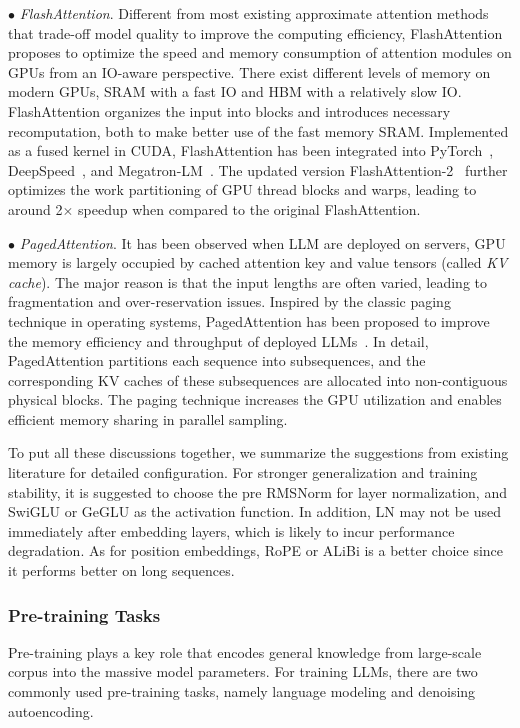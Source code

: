 {{    $\bullet$ \emph{FlashAttention}. Different from most existing approximate attention methods that trade-off model quality to improve the computing efficiency, FlashAttention~\cite{Dao-NeurIPS-2020-FLASH} proposes to optimize the speed and memory consumption of attention modules on GPUs from an IO-aware perspective. There exist different levels of memory on modern GPUs, \eg SRAM with a fast IO and HBM with a relatively slow IO. FlashAttention organizes the input into blocks and introduces necessary recomputation, both to make better use of the fast memory SRAM.  Implemented as a fused kernel in CUDA, FlashAttention has been integrated into PyTorch~\cite{Paszke-NeurIPS-2019-Pytorch}, DeepSpeed~\cite{Rasley-KDD-2020-DeepSpeed}, and Megatron-LM~\cite{Shoeybi-arXiv-2019-Megatron}. {The updated version FlashAttention-2~\cite{Dao-2023-arxiv-flashattention2} further optimizes the work partitioning of GPU thread blocks and warps, leading to around 2$\times$ speedup when compared to the original FlashAttention.}

    $\bullet$ \emph{PagedAttention}.  %
    {It has been observed when LLM are deployed on servers, GPU memory is largely occupied by cached attention key and value tensors (called \emph{KV cache}). The major reason is that the input lengths are often varied, leading to fragmentation and over-reservation issues. Inspired by the classic paging technique in operating systems, PagedAttention has been proposed to improve the memory efficiency and throughput of deployed LLMs~\cite{vllm-pagedattention}. In detail, PagedAttention partitions each sequence into subsequences, and the corresponding KV caches of these subsequences are allocated into non-contiguous physical blocks. The paging technique increases the GPU utilization  and enables efficient memory sharing in parallel sampling.}


To put all these discussions together, we summarize the suggestions from existing literature for detailed configuration.  
For stronger generalization and training stability, it is suggested to choose the pre RMSNorm for layer normalization, and SwiGLU or GeGLU as the activation function. %
{In addition,  LN may not be used immediately after embedding layers, which is likely to incur  performance degradation.} As for position embeddings, {RoPE} or ALiBi is a better choice since it performs better on long sequences. %

\subsubsection{Pre-training Tasks}
Pre-training plays a key role that encodes general knowledge from large-scale corpus into the massive model parameters. 
For training LLMs, there are two commonly used pre-training tasks, namely language modeling and denoising autoencoding. %



}}
